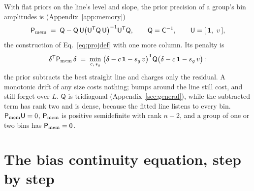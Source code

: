 With flat priors on the line's level and slope, the prior precision of
a group's bin amplitudes is (Appendix~\ref{app:memory})
\begin{equation}
  \mathsf{P}_{\rm mem}
  \;=\;
  \mathsf{Q} - \mathsf{Q}\,\mathsf{U}
  \bigl(\mathsf{U}^{\mathsf{T}} \mathsf{Q}\, \mathsf{U}\bigr)^{-1}
  \mathsf{U}^{\mathsf{T}} \mathsf{Q},
  \qquad
  \mathsf{Q} = \mathsf{C}^{-1},
  \qquad
  \mathsf{U} = [\,\mathbf{1},\ v\,],
  \label{eq:memproj}
\end{equation}
the construction of Eq.~\eqref{eq:projdef} with one more column.  Its
penalty is
\begin{equation}
  \delta^{\mathsf{T}} \mathsf{P}_{\rm mem}\, \delta
  \;=\;
  \min_{c,\, s_g}\;
  \bigl(\delta - c\,\mathbf{1} - s_g\, v\bigr)^{\mathsf{T}}
  \mathsf{Q}
  \bigl(\delta - c\,\mathbf{1} - s_g\, v\bigr) :
  \label{eq:memmin}
\end{equation}
the prior subtracts the best straight line and charges only the
residual.  A monotonic drift of any size costs nothing; bumps around
the line still cost, and still forget over $L$.  $\mathsf{Q}$ is
tridiagonal (Appendix~\ref{sec:general}), while the subtracted term has
rank two and is dense, because the fitted line listens to every bin.
$\mathsf{P}_{\rm mem}\mathsf{U} = 0$, $\mathsf{P}_{\rm mem}$ is positive
semidefinite with rank $n - 2$, and a group of one or two bins has
$\mathsf{P}_{\rm mem} = 0$.

\section{The bias continuity equation, step by step}
\label{app:continuity}

